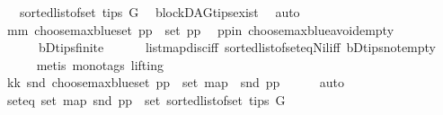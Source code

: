 \begin{isabellebody}
\ \ \ {\isacharparenleft}{\kern0pt}sorted{\isacharunderscore}{\kern0pt}list{\isacharunderscore}{\kern0pt}of{\isacharunderscore}{\kern0pt}set\ {\isacharparenleft}{\kern0pt}tips\ G{\isacharparenright}{\kern0pt}{\isacharparenright}{\kern0pt}{\isacharparenright}{\kern0pt}{\isachardoublequoteclose}\ \isamarkupfalse%
\ blockDAG{\isachardot}{\kern0pt}tips{\isacharunderscore}{\kern0pt}exist\ \isamarkupfalse%
\ auto\isanewline
\ \ \isamarkupfalse%
\ mm{\isacharcolon}{\kern0pt}\ {\isachardoublequoteopen}choose{\isacharunderscore}{\kern0pt}max{\isacharunderscore}{\kern0pt}blue{\isacharunderscore}{\kern0pt}set\ pp\ {\isasymin}\ set\ pp{\isachardoublequoteclose}\ \isamarkupfalse%
\ pp{\isacharunderscore}{\kern0pt}in\ choose{\isacharunderscore}{\kern0pt}max{\isacharunderscore}{\kern0pt}blue{\isacharunderscore}{\kern0pt}avoid{\isacharunderscore}{\kern0pt}empty\isanewline
\ \ \ \ \ \ bD{\isachardot}{\kern0pt}tips{\isacharunderscore}{\kern0pt}finite\isanewline
\ \ \ \ \ \ list{\isachardot}{\kern0pt}map{\isacharunderscore}{\kern0pt}disc{\isacharunderscore}{\kern0pt}iff\ sorted{\isacharunderscore}{\kern0pt}list{\isacharunderscore}{\kern0pt}of{\isacharunderscore}{\kern0pt}set{\isacharunderscore}{\kern0pt}eq{\isacharunderscore}{\kern0pt}Nil{\isacharunderscore}{\kern0pt}iff\ bD{\isachardot}{\kern0pt}tips{\isacharunderscore}{\kern0pt}not{\isacharunderscore}{\kern0pt}empty\ \isanewline
\ \ \ \ \isamarkupfalse%
\ {\isacharparenleft}{\kern0pt}metis\ {\isacharparenleft}{\kern0pt}mono{\isacharunderscore}{\kern0pt}tags{\isacharcomma}{\kern0pt}\ lifting{\isacharparenright}{\kern0pt}{\isacharparenright}{\kern0pt}\ \ \isanewline
\ \ \isamarkupfalse%
\ \isamarkupfalse%
\ kk{\isacharcolon}{\kern0pt}\ {\isachardoublequoteopen}snd\ {\isacharparenleft}{\kern0pt}choose{\isacharunderscore}{\kern0pt}max{\isacharunderscore}{\kern0pt}blue{\isacharunderscore}{\kern0pt}set\ pp{\isacharparenright}{\kern0pt}\ {\isasymin}\ set\ {\isacharparenleft}{\kern0pt}map\ \ snd\ pp{\isacharparenright}{\kern0pt}{\isachardoublequoteclose}\isanewline
\ \ \ \ \isamarkupfalse%
\ auto\ \isanewline
\ \ \isamarkupfalse%
\ seteq{\isacharcolon}{\kern0pt}\ {\isachardoublequoteopen}set\ {\isacharparenleft}{\kern0pt}map\ snd\ pp{\isacharparenright}{\kern0pt}\ {\isacharequal}{\kern0pt}\ set\ {\isacharparenleft}{\kern0pt}sorted{\isacharunderscore}{\kern0pt}list{\isacharunderscore}{\kern0pt}of{\isacharunderscore}{\kern0pt}set\ {\isacharparenleft}{\kern0pt}tips\ G{\isacharparenright}{\kern0pt}{\isacharparenright}{\kern0pt}{\isachardoublequoteclose}\ \isanewline

\end{isabellebody}
